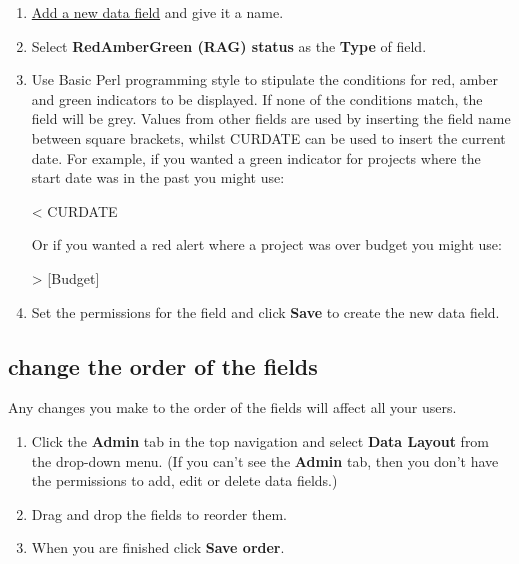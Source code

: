 \documentclass{ctrlo-int-toc}
\begin{document}
\begin{admin}
\begin{enumerate}
\item \hyperref[subsec:addfield]{Add a new data field} and give it a name.
\item Select \textbf{RedAmberGreen (RAG) status} as the \textbf{Type} of field. 
\item Use Basic Perl programming style to stipulate the conditions for red, amber and green indicators to be displayed. If none of the conditions match, the field will be grey. \newline
Values from other fields are used by inserting the field name between square brackets, whilst {\textquotedbl}CURDATE{\textquotedbl} can be used to insert the current date. \newline
For example, if you wanted a green indicator for projects where the start date was in the past you might use: 
\begin{code}
 {\textless} CURDATE\newline
\end{code}

Or if you wanted a red alert where a project was over budget you might use: \newline

\begin{code}
 > [Budget]
\end{code}

\item Set the permissions for the field and click \textbf{Save} to create the new data field. 
\end{enumerate}
\subsection[change the order of the fields]{change the order of the fields}
Any changes you make to the order of the fields will affect all your users. 

\begin{enumerate}
\item Click the \textbf{Admin} tab in the top navigation and select \textbf{Data Layout} from the drop-down menu. (If you can't see the \textbf{Admin} tab, then you don't have the permissions to add, edit or delete data fields.)
\item Drag and drop the fields to reorder them. 
\item When you are finished click \textbf{Save order}.
\end{enumerate}

\end{admin}
\end{document}
